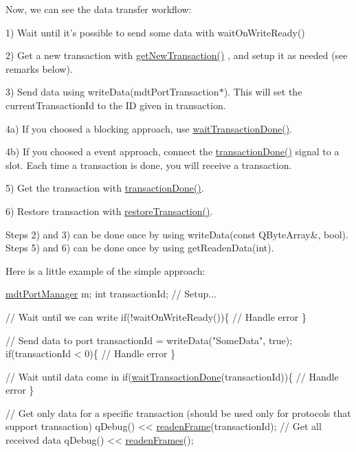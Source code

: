 Now, we can see the data transfer workflow\-:
\begin{DoxyItemize}
\item 1) Wait until it's possible to send some data with wait\-On\-Write\-Ready()
\item 2) Get a new transaction with \hyperlink{classmdt_port_manager_a75ebd3d1859e3ed38b9558981e53aac4}{get\-New\-Transaction()} , and setup it as needed (see remarks below).
\item 3) Send data using write\-Data(mdt\-Port\-Transaction$\ast$). This will set the current\-Transaction\-Id to the I\-D given in transaction.
\item 4a) If you choosed a blocking approach, use \hyperlink{classmdt_port_manager_a5551802de2c08632078f2cc0e2607913}{wait\-Transaction\-Done()}.
\item 4b) If you choosed a event approach, connect the \hyperlink{classmdt_port_manager_a5869bcf6774a86fb9d3b00a0d4211bb5}{transaction\-Done()} signal to a slot. Each time a transaction is done, you will receive a transaction.
\item 5) Get the transaction with \hyperlink{classmdt_port_manager_a5869bcf6774a86fb9d3b00a0d4211bb5}{transaction\-Done()}.
\item 6) Restore transaction with \hyperlink{classmdt_port_manager_a5fea4a9b8e94d38e8ec699dba05c7ca8}{restore\-Transaction()}.
\end{DoxyItemize}

Steps 2) and 3) can be done once by using write\-Data(const Q\-Byte\-Array\&, bool). Steps 5) and 6) can be done once by using get\-Readen\-Data(int).

Here is a little example of the simple approach\-: 
\begin{DoxyCode}
\hyperlink{classmdt_port_manager}{mdtPortManager} m;
\textcolor{keywordtype}{int} transactionId;
\textcolor{comment}{// Setup...}

\textcolor{comment}{// Wait until we can write}
\textcolor{keywordflow}{if}(!waitOnWriteReady())\{
  \textcolor{comment}{// Handle error}
\}

\textcolor{comment}{// Send data to port}
transactionId = writeData(\textcolor{stringliteral}{"SomeData"}, \textcolor{keyword}{true});
\textcolor{keywordflow}{if}(transactionId < 0)\{
  \textcolor{comment}{// Handle error}
\}

\textcolor{comment}{// Wait until data come in}
\textcolor{keywordflow}{if}(\hyperlink{classmdt_port_manager_a5551802de2c08632078f2cc0e2607913}{waitTransactionDone}(transactionId))\{
  \textcolor{comment}{// Handle error}
\}

\textcolor{comment}{// Get only data for a specific transaction (should be used only for protocols that support transaction)}
qDebug() << \hyperlink{classmdt_port_manager_a830ae182d06dd6a52c43a7f45b9240ac}{readenFrame}(transactionId);
\textcolor{comment}{// Get all received data}
qDebug() << \hyperlink{classmdt_port_manager_addd5dcae9644cea42a9871205af41796}{readenFrames}();
\end{DoxyCode}



